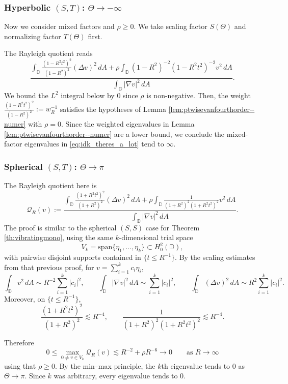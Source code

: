 \documentclass[11pt]{amsart}
\theoremstyle{definition}
\numberwithin{equation}{section}
\newcommand{\lapl}{\Delta}
\newcommand{\grad}{\nabla}
\newcommand{\D}{\mathbb{D}}
\begin{document}
\subsubsection*{Hyperbolic $(S, T)$: $\Theta \to -\infty$}

Now we consider mixed factors and $\rho \geq 0$. We take scaling factor $S(\Theta)$ and normalizing factor $T(\Theta)$ first.


The Rayleigh quotient reads
\begin{equation}\label{eq:idk_theres_a_lot}
\dfrac{\displaystyle \int_{\D}\frac{(1-R^2t^2)^2}{(1-R^2)^2}(\lapl v)^2 \,  dA +  \rho\int_{\D} (1-R^2)^{-2}(1-R^2t^2)^{-2}v^2 \, dA}{\displaystyle \int_{\D} |\grad v|^2 \, dA}.
\end{equation}
We bound the $L^2$ integral below by 0 since $\rho$ is non-negative. Then, the weight $\frac{(1-R^2t^2)^2}{(1-R^2)^2} := w_R^{-1}$ satisfies the hypotheses of Lemma \ref{lem:ptwisevanfourthorder--numer} with $\rho = 0$. Since the weighted eigenvalues in Lemma \ref{lem:ptwisevanfourthorder--numer} are a lower bound, we conclude the mixed-factor eigenvalues in \eqref{eq:idk_theres_a_lot} tend to $\infty$.

\subsubsection*{Spherical $(S,T)$: $\Theta\to\pi$}

The Rayleigh quotient here is
\[
\mathcal Q_R(v):=
\frac{\displaystyle \int_{\D}\frac{(1+R^2t^2)^2}{(1+R^2)^2}(\lapl v)^2\,dA
+\rho\int_{\D}\frac{1}{(1+R^2)^2(1+R^2t^2)^2}v^2\,dA}
{\displaystyle \int_{\D}|\grad v|^2\,dA}.
\]
The proof is similar to the spherical $(S,S)$ case for Theorem \ref{th:vibratingmono}, using the same \(k\)-dimensional trial space
\[
V_k=\mathrm{span}\{\eta_1,\dots,\eta_k\}\subset H_0^2(\D),
\]
with pairwise disjoint supports contained in \(\{t\le R^{-1}\}\). By the scaling estimates from that previous proof, for
\(v=\sum_{i=1}^k c_i\eta_i\),
\[
\int_\D v^2\,dA \sim R^{-2}\sum_{i=1}^k |c_i|^2,\qquad
\int_\D |\grad v|^2\,dA \sim \sum_{i=1}^k |c_i|^2,\qquad
\int_\D (\lapl v)^2\,dA \sim R^{2}\sum_{i=1}^k |c_i|^2.
\]
Moreover, on \(\{t\le R^{-1}\}\),
\[
\frac{(1+R^2t^2)^2}{(1+R^2)^2}\lesssim R^{-4},
\qquad
\frac{1}{(1+R^2)^2(1+R^2t^2)^2}\lesssim R^{-4}.
\]

Therefore
\[
0\le \max_{0\neq v\in V_k}\mathcal Q_R(v)\lesssim R^{-2}+\rho R^{-6}\to 0
\qquad\text{as }R\to\infty
\]
using that $\rho \geq 0$. By the min--max principle, the \(k\)th eigenvalue tends to \(0\) as \(\Theta\to\pi\). Since \(k\) was arbitrary, every eigenvalue tends to \(0\).
\end{document}
